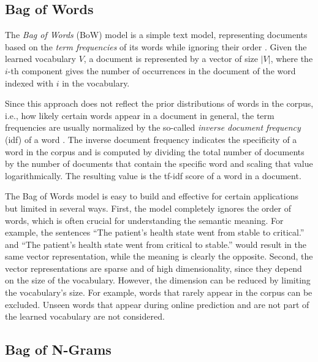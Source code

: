 \subsection{Bag of Words}\label{sec:bow}

The \textit{Bag of Words} (BoW) model is a simple text model, representing documents based on the \textit{term frequencies} of its words while ignoring their order \cite{harris1954distributional}.
Given the learned vocabulary $V$, a document is represented by a vector of size $|V|$, where the $i$-th component gives the number of occurrences in the document of the word indexed with $i$ in the vocabulary.

Since this approach does not reflect the prior distributions of words in the corpus, i.e., how likely certain words appear in a document in general, the term frequencies are usually normalized by the so-called \textit{inverse document frequency} (idf) of a word \cite{DBLP:journals/cacm/SaltonWY75}.
The inverse document frequency indicates the specificity of a word in the corpus and is computed by dividing the total number of documents by the number of documents that contain the specific word and scaling that value logarithmically.
The resulting value is the tf-idf score of a word in a document.

The Bag of Words model is easy to build and effective for certain applications but limited in several ways.
First, the model completely ignores the order of words, which is often crucial for understanding the semantic meaning.
For example, the sentences  \enquote{The patient’s health state went from stable to critical.} and  \enquote{The patient’s health state went from critical to stable.} would result in the same vector representation, while the meaning is clearly the opposite.
Second, the vector representations are sparse and of high dimensionality, since they depend on the size of the vocabulary.
However, the dimension can be reduced by limiting the vocabulary's size.
For example, words that rarely appear in the corpus can be excluded.
Unseen words that appear during online prediction and are not part of the learned vocabulary are not considered.

\subsection{Bag of N-Grams}


